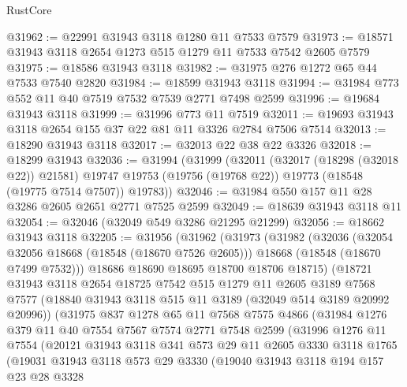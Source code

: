 \begin{lexlean}{RustCore}
\begin{coremodule}
@31962 := @22991 @31943 @3118 @1280 @11 @7533 @7579
@31973 := @18571 @31943 @3118 @2654 @1273 @515 @1279 @11 @7533 @7542 @2605 @7579
@31975 := @18586 @31943 @3118
@31982 := @31975 @276 @1272 @65 @44 @7533 @7540 @2820
@31984 := @18599 @31943 @3118
@31994 := @31984 @773 @552 @11 @40 @7519 @7532 @7539 @2771 @7498 @2599
@31996 := @19684 @31943 @3118
@31999 := @31996 @773 @11 @7519
@32011 := @19693 @31943 @3118 @2654 @155 @37 @22 @81 @11 @3326 @2784 @7506 @7514
@32013 := @18290 @31943 @3118
@32017 := @32013 @22 @38 @22 @3326
@32018 := @18299 @31943
@32036 := @31994
    (@31999
      (@32011
        (@32017 (@18298 (@32018 @22)) @21581)
        @19747
        @19753
        (@19756 (@19768 @22))
        @19773
        (@18548 (@19775 @7514 @7507))
        @19783))
@32046 := @31984 @550 @157 @11 @28 @3286 @2605 @2651 @2771 @7525 @2599
@32049 := @18639 @31943 @3118 @11
@32054 := @32046 (@32049 @549 @3286 @21295 @21299)
@32056 := @18662 @31943 @3118
@32205 := @31956
    (@31962
      (@31973
        (@31982
          (@32036
            (@32054 @32056 @18668 (@18548 (@18670 @7526 @2605)))
            @18668
            (@18548 (@18670 @7499 @7532)))
          @18686
          @18690
          @18695
          @18700
          @18706
          @18715)
        (@18721
          @31943
          @3118
          @2654
          @18725
          @7542
          @515
          @1279
          @11
          @2605
          @3189
          @7568
          @7577
          (@18840 @31943 @3118 @515 @11 @3189 (@32049 @514 @3189 @20992 @20996))
          (@31975
            @837
            @1278
            @65
            @11
            @7568
            @7575
            @4866
            (@31984
              @1276
              @379
              @11
              @40
              @7554
              @7567
              @7574
              @2771
              @7548
              @2599
              (@31996
                @1276
                @11
                @7554
                (@20121
                  @31943
                  @3118
                  @341
                  @573
                  @29
                  @11
                  @2605
                  @3330
                  @3118
                  @1765
                  (@19031
                    @31943
                    @3118
                    @573
                    @29
                    @3330
                    (@19040
                      @31943
                      @3118
                      @194
                      @157
                      @23
                      @28
                      @3328

\end{coremodule}
\end{lexlean}
